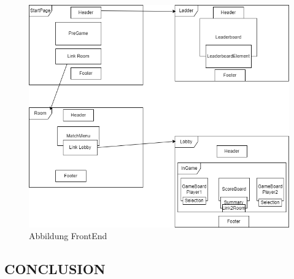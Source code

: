 \documentclass[conference]{IEEEtran}
\begin{document}
\begin{itemize}
\begin{figure}[htbp]
\centering
\includegraphics[scale=0.35]{FrontEndApplication.png}
\caption{Abbildung FrontEnd}%
\end{figure}
\begin{itemize}

\section{CONCLUSION}

\addtolength{\textheight}{-12cm}   %










\end{itemize}
\end{itemize}
\end{document}
